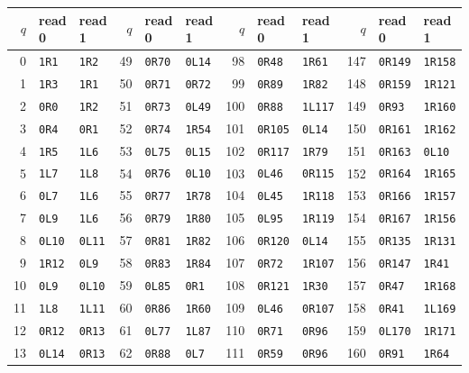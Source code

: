 \begin{center}\small
\setlength{\tabcolsep}{4.5pt}
\renewcommand{\arraystretch}{1.04}
\begin{tabular}{@{}rll@{\quad}rll@{\quad}rll@{\quad}rll@{}}
\toprule
$q$&read 0&read 1&$q$&read 0&read 1&$q$&read 0&read 1&$q$&read 0&read 1\\\midrule
0&\texttt{1R1}&\texttt{1R2}&49&\texttt{0R70}&\texttt{0L14}&98&\texttt{0R48}&\texttt{1R61}&147&\texttt{0R149}&\texttt{1R158}\\
1&\texttt{1R3}&\texttt{1R1}&50&\texttt{0R71}&\texttt{0R72}&99&\texttt{0R89}&\texttt{1R82}&148&\texttt{0R159}&\texttt{1R121}\\
2&\texttt{0R0}&\texttt{1R2}&51&\texttt{0R73}&\texttt{0L49}&100&\texttt{0R88}&\texttt{1L117}&149&\texttt{0R93}&\texttt{1R160}\\
3&\texttt{0R4}&\texttt{0R1}&52&\texttt{0R74}&\texttt{1R54}&101&\texttt{0R105}&\texttt{0L14}&150&\texttt{0R161}&\texttt{1R162}\\
4&\texttt{1R5}&\texttt{1L6}&53&\texttt{0L75}&\texttt{0L15}&102&\texttt{0R117}&\texttt{1R79}&151&\texttt{0R163}&\texttt{0L10}\\
5&\texttt{1L7}&\texttt{1L8}&54&\texttt{0R76}&\texttt{0L10}&103&\texttt{0L46}&\texttt{0R115}&152&\texttt{0R164}&\texttt{1R165}\\
6&\texttt{0L7}&\texttt{1L6}&55&\texttt{0R77}&\texttt{1R78}&104&\texttt{0L45}&\texttt{1R118}&153&\texttt{0R166}&\texttt{1R157}\\
7&\texttt{0L9}&\texttt{1L6}&56&\texttt{0R79}&\texttt{1R80}&105&\texttt{0L95}&\texttt{1R119}&154&\texttt{0R167}&\texttt{1R156}\\
8&\texttt{0L10}&\texttt{0L11}&57&\texttt{0R81}&\texttt{1R82}&106&\texttt{0R120}&\texttt{0L14}&155&\texttt{0R135}&\texttt{1R131}\\
9&\texttt{1R12}&\texttt{0L9}&58&\texttt{0R83}&\texttt{1R84}&107&\texttt{0R72}&\texttt{1R107}&156&\texttt{0R147}&\texttt{1R41}\\
10&\texttt{0L9}&\texttt{0L10}&59&\texttt{0L85}&\texttt{0R1}&108&\texttt{0R121}&\texttt{1R30}&157&\texttt{0R47}&\texttt{1R168}\\
11&\texttt{1L8}&\texttt{1L11}&60&\texttt{0R86}&\texttt{1R60}&109&\texttt{0L46}&\texttt{0R107}&158&\texttt{0R41}&\texttt{1L169}\\
12&\texttt{0R12}&\texttt{0R13}&61&\texttt{0L77}&\texttt{1L87}&110&\texttt{0R71}&\texttt{0R96}&159&\texttt{0L170}&\texttt{1R171}\\
13&\texttt{0L14}&\texttt{0R13}&62&\texttt{0R88}&\texttt{0L7}&111&\texttt{0R59}&\texttt{0R96}&160&\texttt{0R91}&\texttt{1R64}\\

\end{tabular}
\end{center}
